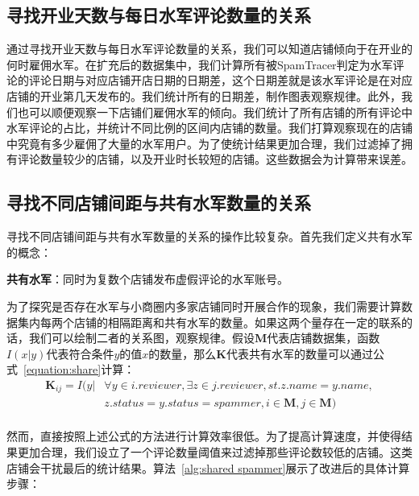 \subsection{寻找开业天数与每日水军评论数量的关系}

通过寻找开业天数与每日水军评论数量的关系，我们可以知道店铺倾向于在开业的何时雇佣水军。在扩充后的数据集中，我们计算所有被SpamTracer判定为水军评论的评论日期与对应店铺开店日期的日期差，这个日期差就是该水军评论是在对应店铺的开业第几天发布的。我们统计所有的日期差，制作图表观察规律。此外，我们也可以顺便观察一下店铺们雇佣水军的倾向。我们统计了所有店铺的所有评论中水军评论的占比，并统计不同比例的区间内店铺的数量。我们打算观察现在的店铺中究竟有多少雇佣了大量的水军用户。为了使统计结果更加合理，我们过滤掉了拥有评论数量较少的店铺，以及开业时长较短的店铺。这些数据会为计算带来误差。



\subsection{寻找不同店铺间距与共有水军数量的关系}

寻找不同店铺间距与共有水军数量的关系的操作比较复杂。首先我们定义共有水军的概念：

\begin{defn}
	\textbf{共有水军}：同时为复数个店铺发布虚假评论的水军账号。
\end{defn}

为了探究是否存在水军与小商圈内多家店铺同时开展合作的现象，我们需要计算数据集内每两个店铺的相隔距离和共有水军的数量。如果这两个量存在一定的联系的话，我们可以绘制二者的关系图，观察规律。假设$\mathbf{M}$代表店铺数据集，函数$I(x|y)$代表符合条件$y$的值$x$的数量，那么$\mathbf{K}$代表共有水军的数量可以通过公式~\eqref{equation:share}计算：
\begin{equation}
\label{equation:share}
\begin{aligned}
\mathbf{K}_{ij} = I(y| &\forall y \in i.reviewer, \exists z \in j.reviewer, st. z.name = y.name, \\
&z.status = y.status = spammer, i \in \mathbf{M}, j \in \mathbf{M})\\
\end{aligned}
\end{equation}

然而，直接按照上述公式的方法进行计算效率很低。为了提高计算速度，并使得结果更加合理，我们设立了一个评论数量阈值来过滤掉那些评论数较低的店铺。这类店铺会干扰最后的统计结果。算法~\ref{alg:shared spammer}展示了改进后的具体计算步骤：


